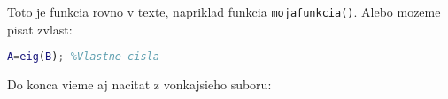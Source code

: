 \documentclass{book}
\begin{document}
Toto je funkcia rovno v texte, napriklad funkcia \lstinline[columns=fixed]{mojafunkcia()}. Alebo mozeme pisat zvlast: 
\begin{lstlisting}[language=Matlab]
A=eig(B); %Vlastne cisla
\end{lstlisting}

Do konca vieme aj nacitat z vonkajsieho suboru:

\end{document}
